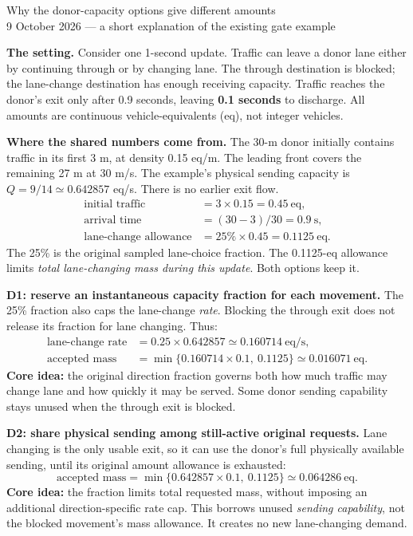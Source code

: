 \documentclass[11pt,a4paper]{article}
\begin{document}
\begin{center}
{\Large Why the donor-capacity options give different amounts}\\[3pt]
9 October 2026 --- a short explanation of the existing gate example
\end{center}

\textbf{The setting.} Consider one 1-second update. Traffic can leave a donor
lane either by continuing through or by changing lane. The through destination
is blocked; the lane-change destination has enough receiving capacity. Traffic
reaches the donor's exit only after 0.9 seconds, leaving \textbf{0.1 seconds}
to discharge. All amounts are continuous vehicle-equivalents (eq), not integer
vehicles.

\textbf{Where the shared numbers come from.} The 30-m donor initially contains
traffic in its first 3 m, at density 0.15 eq/m. The leading front covers the
remaining 27 m at 30 m/s. The example's physical sending capacity is
$Q=9/14\simeq0.642857$ eq/s. There is no earlier exit flow.
\[
\begin{aligned}
\text{initial traffic}&=3\times0.15=0.45\ \mathrm{eq},\\
\text{arrival time}&=(30-3)/30=0.9\ \mathrm{s},\\
\text{lane-change allowance}&=25\%\times0.45=0.1125\ \mathrm{eq}.
\end{aligned}
\]
The 25\% is the original sampled lane-choice fraction. The 0.1125-eq allowance
limits \emph{total lane-changing mass during this update}. Both options keep it.

\textbf{D1: reserve an instantaneous capacity fraction for each movement.}
The 25\% fraction also caps the lane-change \emph{rate}. Blocking the through
exit does not release its fraction for lane changing. Thus:
\[
\begin{aligned}
\text{lane-change rate}&=0.25\times0.642857\simeq0.160714\ \mathrm{eq/s},\\
\text{accepted mass}&=\min\{0.160714\times0.1,\ 0.1125\}
\simeq\boxed{0.016071\ \mathrm{eq}}.
\end{aligned}
\]
\textbf{Core idea:} the original direction fraction governs both how much
traffic may change lane and how quickly it may be served. Some donor sending
capability stays unused when the through exit is blocked.

\textbf{D2: share physical sending among still-active original requests.}
Lane changing is the only usable exit, so it can use the donor's full physically
available sending, until its original amount allowance is exhausted:
\[
\text{accepted mass}=\min\{0.642857\times0.1,\ 0.1125\}
\simeq\boxed{0.064286\ \mathrm{eq}}.
\]
\textbf{Core idea:} the fraction limits total requested mass, without imposing
an additional direction-specific rate cap. This borrows unused \emph{sending
capability}, not the blocked movement's mass allowance. It creates no new
lane-changing demand.
\end{document}
